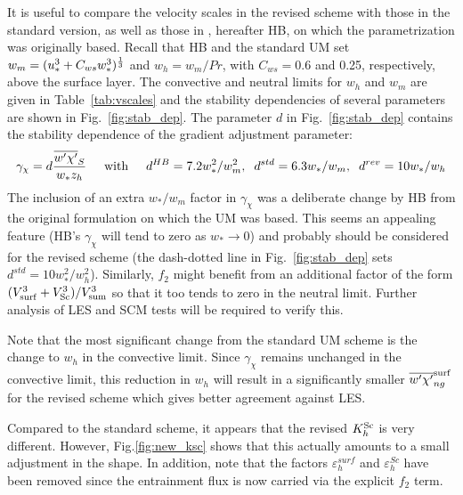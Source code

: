 \documentclass{UMDP_article}
\begin{document}
It is useful to compare the velocity scales in the revised scheme with
those in the standard version, as well as those in
\cite{holtslag93:_local_versus_nonloc_bound_layer}, hereafter HB, on
which the parametrization was originally based.  Recall that HB and
the standard UM set $w_m = (u_*^3 + C_{ws} w_*^3)^{\frac{1}{3}}$ and $w_h
= w_m/Pr$, with $C_{ws} = 0.6$ and 0.25, respectively, above the
surface layer.  The convective and neutral limits for $w_h$ and $w_m$
are given in Table~\ref{tab:vscales} and the stability dependencies of
several parameters are shown in Fig.~\ref{fig:stab_dep}.  The
parameter $d$ in Fig.~\ref{fig:stab_dep} contains the stability
dependence of the gradient adjustment parameter:
\begin{equation}
  \gamma_{\chi}= d \frac{\overline{w'\chi'}_S}{w_* z_h} 
  \hspace{0.5cm} {\rm with}  \hspace{0.5cm} 
  d^{HB} = 7.2 w_*^2/w_m^2,  \hspace{0.2cm} 
  d^{std} = 6.3 w_*/w_m,  \hspace{0.2cm} 
  d^{rev} = 10 w_*/w_h
  \label{grad_adj}
\end{equation}
The inclusion of an extra $w_*/w_m$ factor in $\gamma_{\chi}$ was a
deliberate change by HB from the original
\cite{troen86:_simpl_model_atmos_bound_layer} formulation on which the
UM was based.  This seems an appealing feature (HB's $\gamma_{\chi}$
will tend to zero as $w_* \rightarrow 0$) and probably should be
considered for the revised scheme (the dash-dotted line in
Fig.~\ref{fig:stab_dep} sets $d^{std} = 10 w_*^2/w_h^2$).  Similarly,
$f_2$ might benefit from an additional factor of the form $(V_{\rm surf}^3 +
V_{\rm Sc}^3 )/ V_{\rm sum}^3 $ so that it too tends to zero in the neutral limit.
Further analysis of LES and SCM tests will be required to verify this.

Note that the most significant change from the standard UM scheme is
the change to $w_h$ in the convective limit.  Since $\gamma_{\chi}$
remains unchanged in the convective limit, this reduction in $w_h$
will result in a significantly smaller $\overline{w'\chi'}_{ng}^{\rm surf}$ for the revised scheme
which gives better agreement against LES.

Compared to the standard scheme, it appears that the revised $K_h^{\rm Sc}$
is very different.  However, Fig.\ref{fig:new_ksc} shows that this
actually amounts to a small adjustment in the shape.  In addition,
note that the factors $\varepsilon_h^{surf}$ and $\varepsilon_h^{Sc}$
have been removed since the entrainment flux is now carried via the
explicit $f_2$ term.
\end{document}
